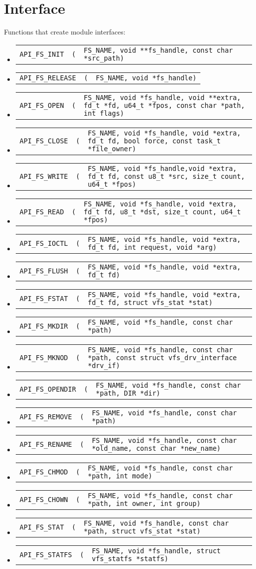 \documentclass[a4paper,11pt]{report}
\makeatletter
\newcommand{\code}[1]{\texttt{#1}}
\newcommand{\prototype}[2]{
   \begin{tabularx}{\textwidth}{@{}l@{}l@{}X}
      \code{#1} & \code{(} & \code{#2)}
   \end{tabularx}
}
\makeatother
\begin{document}
\section{Interface}
Functions that create module interfaces:
\begin{itemize}
   \item\prototype{API\_FS\_INIT}{FS\_NAME, void **fs\_handle, const char *src\_path}
   \item\prototype{API\_FS\_RELEASE}{FS\_NAME, void *fs\_handle}
   \item\prototype{API\_FS\_OPEN}{FS\_NAME, void *fs\_handle, void **extra, fd\_t *fd, u64\_t *fpos, const char *path, int flags}
   \item\prototype{API\_FS\_CLOSE}{FS\_NAME, void *fs\_handle, void *extra, fd\_t fd, bool force, const task\_t *file\_owner}
   \item\prototype{API\_FS\_WRITE}{FS\_NAME, void *fs\_handle,void *extra, fd\_t fd, const u8\_t *src, size\_t count, u64\_t *fpos}
   \item\prototype{API\_FS\_READ}{FS\_NAME, void *fs\_handle, void *extra, fd\_t fd, u8\_t *dst, size\_t count, u64\_t *fpos}
   \item\prototype{API\_FS\_IOCTL}{FS\_NAME, void *fs\_handle, void *extra, fd\_t fd, int request, void *arg}
   \item\prototype{API\_FS\_FLUSH}{FS\_NAME, void *fs\_handle, void *extra, fd\_t fd}
   \item\prototype{API\_FS\_FSTAT}{FS\_NAME, void *fs\_handle, void *extra, fd\_t fd, struct vfs\_stat *stat}
   \item\prototype{API\_FS\_MKDIR}{FS\_NAME, void *fs\_handle, const char *path}
   \item\prototype{API\_FS\_MKNOD}{FS\_NAME, void *fs\_handle, const char *path, const struct vfs\_drv\_interface *drv\_if}
   \item\prototype{API\_FS\_OPENDIR}{FS\_NAME, void *fs\_handle, const char *path, DIR *dir}
   \item\prototype{API\_FS\_REMOVE}{FS\_NAME, void *fs\_handle, const char *path}
   \item\prototype{API\_FS\_RENAME}{FS\_NAME, void *fs\_handle, const char *old\_name, const char *new\_name}
   \item\prototype{API\_FS\_CHMOD}{FS\_NAME, void *fs\_handle, const char *path, int mode}
   \item\prototype{API\_FS\_CHOWN}{FS\_NAME, void *fs\_handle, const char *path, int owner, int group}
   \item\prototype{API\_FS\_STAT}{FS\_NAME, void *fs\_handle, const char *path, struct vfs\_stat *stat}
   \item\prototype{API\_FS\_STATFS}{FS\_NAME, void *fs\_handle, struct vfs\_statfs *statfs}
\end{itemize}
\end{document}
